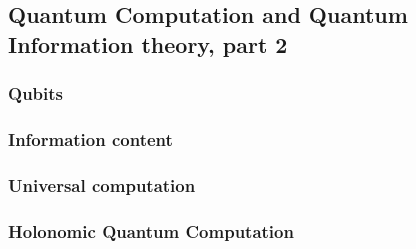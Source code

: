 \subsection{Quantum Computation and Quantum Information theory, part 2}

\subsubsection{Qubits}

\subsubsection{Information content}

\subsubsection{Universal computation}

\subsubsection{Holonomic Quantum Computation}

